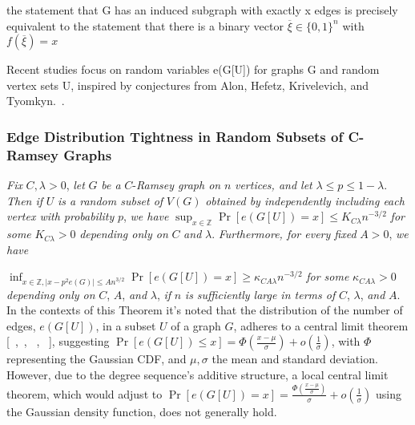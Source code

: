 the statement that G has an induced subgraph with exactly x edges is precisely equivalent to
the statement that there is a binary vector $\overline{\xi} \in \{ 0,1 \}^n $ with $f(\overline{\xi})=x $

Recent studies focus on random variables e(G[U]) for graphs G and random vertex sets U,
inspired by conjectures from Alon, Hefetz, Krivelevich, and Tyomkyn.~\cite{alon2020edge}.

\subsubsection{Edge Distribution Tightness in Random Subsets of C-Ramsey Graphs}
\textit{Fix} $C, \lambda > 0$, \textit{let} $G$ \textit{be a} $C$-\textit{Ramsey graph on} $n$ \textit{vertices, and let} $\lambda \leq p \leq 1 - \lambda$. \textit{Then if} $U$ \textit{is a random subset of} $V(G)$ \textit{obtained by independently including each vertex with probability} $p$, \textit{we have}
$\sup_{x \in \mathbb{Z}} \Pr[e(G[U]) = x] \leq K_{C\lambda} n^{-3/2}$
\textit{for some} $K_{C\lambda} > 0$ \textit{depending only on} $C$ \textit{and} $\lambda$. \textit{Furthermore, for every fixed} $A > 0$, \textit{we have}

$
\inf_{x \in \mathbb{Z}, |x - p^2 e(G)| \leq An^{3/2}} \Pr[e(G[U]) = x] \geq \kappa_{C A \lambda} n^{-3/2}
$
\textit{for some} $\kappa_{C A \lambda} > 0$ \textit{depending only on} $C$, $A$, \textit{and} $\lambda$, \textit{if} $n$ \textit{is sufficiently large in terms of} $C$, $\lambda$, \textit{and} $A$.
In the contexts of this Theorem it's noted that
the distribution of the number of edges,
$e(G[U])$, in a subset $U$ of a graph $G$,
adheres to a central limit theorem [~\cite{berkowitz2018local},~\cite{berkowitz2016quantitative}, ~\cite{gilmer2016local},~\cite{gnedenko1948local} ], suggesting
$\Pr[e(G[U]) \leq x] = \Phi\left(\frac{x - \mu}{\sigma}\right) + o\left(\frac{1}{\sigma}\right)$,
with $\Phi$ representing the Gaussian CDF, and $\mu, \sigma$ the mean and standard deviation.
However, due to the degree sequence's additive structure,
a local central limit theorem, which would adjust to
$\Pr[e(G[U]) = x] = \frac{\Phi\left(\frac{x-\mu}{\sigma}\right)}{\sigma} +o\left(\frac{1}{\sigma}\right)$
using the Gaussian density function, does not generally hold.

